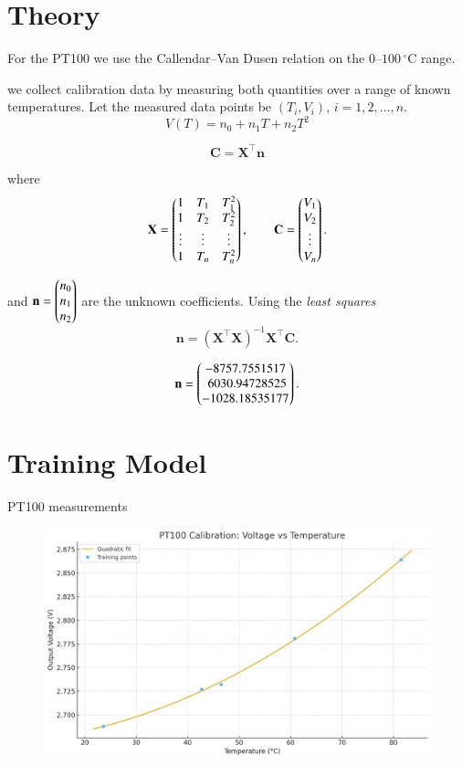 \documentclass[journal]{IEEEtran}
\begin{document}
\section{Theory}
For the PT100 we use the Callendar--Van Dusen relation on the $0$--$100\,^{\circ}\mathrm{C}$ range.

we collect calibration data by measuring both quantities over a range of known temperatures. Let the measured data points be $(T_i, V_i)$, $i=1,2,\ldots,n$.
\[
V(T) = n_0 + n_1 T + n_2 T^2
\]

\[
\mathbf{C} = \mathbf{X}^{\top}\mathbf{n}
\]

where
\[
\mathbf{X} =
\begin{pmatrix}
1 & T_1 & T_1^{2} \\
1 & T_2 & T_2^{2} \\
\vdots & \vdots & \vdots \\
1 & T_n & T_n^{2}
\end{pmatrix},
\qquad
\mathbf{C} =
\begin{pmatrix}
V_1 \\ V_2 \\ \vdots \\ V_n
\end{pmatrix}.
\]

and \(\mathbf{n} = \begin{pmatrix}n_0 \\ n_1 \\ n_2\end{pmatrix}\) are the unknown coefficients. Using the \textit{least squares}
\[
\mathbf{n} = (\mathbf{X}^{\top}\mathbf{X})^{-1}\mathbf{X}^{\top}\mathbf{C}.
\]

\[
\mathbf n
= \begin{pmatrix}
-8757.7551517 \\
\;6030.94728525 \\
-1028.18535177
\end{pmatrix}.
\]

\section{Training Model}

\FloatBarrier               %
\begin{table}[H]            %
  \centering
  \caption{PT100 measurements}\label{tab:pt100}
\end{table}

\FloatBarrier               %
\begin{figure}[H]
  \centering
  \includegraphics[width=\columnwidth]{figs/train.jpg}
\end{figure}
\end{document}
